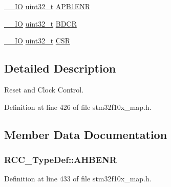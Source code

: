 \begin{DoxyCompactItemize}
\item 
\hyperlink{group___c_m_s_i_s___c_m3__core__definitions_gaec43007d9998a0a0e01faede4133d6be}{\+\_\+\+\_\+\+IO} \hyperlink{_p_e___types_8h_a33594304e786b158f3fb30289278f5af}{uint32\+\_\+t} \hyperlink{struct_r_c_c___type_def_aec7622ba90341c9faf843d9ee54a759f}{A\+P\+B1\+E\+NR}
\item 
\hyperlink{group___c_m_s_i_s___c_m3__core__definitions_gaec43007d9998a0a0e01faede4133d6be}{\+\_\+\+\_\+\+IO} \hyperlink{_p_e___types_8h_a33594304e786b158f3fb30289278f5af}{uint32\+\_\+t} \hyperlink{struct_r_c_c___type_def_a05be375db50e8c9dd24fb3bcf42d7cf1}{B\+D\+CR}
\item 
\hyperlink{group___c_m_s_i_s___c_m3__core__definitions_gaec43007d9998a0a0e01faede4133d6be}{\+\_\+\+\_\+\+IO} \hyperlink{_p_e___types_8h_a33594304e786b158f3fb30289278f5af}{uint32\+\_\+t} \hyperlink{struct_r_c_c___type_def_a7e913b8bf59d4351e1f3d19387bd05b9}{C\+SR}
\end{DoxyCompactItemize}


\subsection{Detailed Description}
Reset and Clock Control. 

Definition at line 426 of file stm32f10x\+\_\+map.\+h.



\subsection{Member Data Documentation}
\subsubsection[{\texorpdfstring{A\+H\+B\+E\+NR}{AHBENR}}]{ R\+C\+C\+\_\+\+Type\+Def\+::\+A\+H\+B\+E\+NR}\hypertarget{struct_r_c_c___type_def_a876b290043b4280f12e5d8cffbfeb646}{}\label{struct_r_c_c___type_def_a876b290043b4280f12e5d8cffbfeb646}


Definition at line 433 of file stm32f10x\+\_\+map.\+h.


